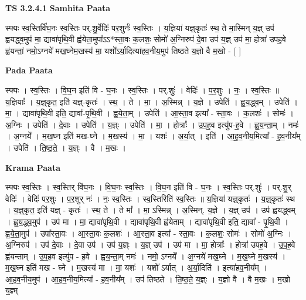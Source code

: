 \documentclass[17pt]{extarticle}
\begin{document}
\textbf{TS 3.2.4.1 } \newline
\textbf{Samhita Paata} \newline

स्फ्यः स्व॒स्तिर्वि॑घ॒नः स्व॒स्तिः पर्.शु॒र्वेदिः॑ पर॒शुर्नः॑ स्व॒स्तिः । य॒ज्ञिया॑ यज्ञ्॒कृतः॑ स्थ॒ ते मा॒स्मिन् य॒ज्ञ् उप॑ ह्वयद्ध्व॒मुप॑ मा॒ द्यावा॑पृथि॒वी ह्व॑येता॒मुपा᳚ऽऽ*स्ता॒वः क॒लशः॒ सोमो॑ अ॒ग्निरुप॑ दे॒वा उप॑ य॒ज्ञ् उप॑ मा॒ होत्रा॑ उपह॒वे ह्व॑यन्तां॒ नमो॒ऽग्नये॑ मख॒घ्नेम॒खस्य॑ मा॒ यशो᳚ऽर्या॒दित्या॑हव॒नीय॒मुप॑ तिष्ठते य॒ज्ञो वै म॒खो - [  ] \newline

\textbf{Pada Paata} \newline

स्फ्यः । स्व॒स्तिः । वि॒घ॒न इति॑ वि - घ॒नः । स्व॒स्तिः । पर्.शुः॑ । वेदिः॑ । प॒र॒शुः । नः॒ । स्व॒स्तिः ॥ य॒ज्ञियाः᳚ । य॒ज्ञ्॒कृत॒ इति॑ यज्ञ्-कृतः॑ । स्थ॒ । ते । मा॒ । अ॒स्मिन्न् । य॒ज्ञे । उपेति॑ । ह्व॒य॒द्ध्व॒म् । उपेति॑ । मा॒ । द्यावा॑पृथि॒वी इति॒ द्यावा᳚-पृ॒थि॒वी । ह्व॒ये॒ता॒म् । उपेति॑ । आ॒स्ता॒व इत्या᳚ - स्ता॒वः । क॒लशः॑ । सोमः॑ । अ॒ग्निः । उपेति॑ । दे॒वाः । उपेति॑ । य॒ज्ञ्ः । उपेति॑ । मा॒ । होत्राः᳚ । उ॒प॒ह॒व इत्यु॑प-ह॒वे । ह्व॒य॒न्ता॒म् । नमः॑ । अ॒ग्नये᳚ । म॒ख॒घ्न इति॑ मख-घ्ने । म॒खस्य॑ । मा॒ । यशः॑ । अ॒र्या॒त् । इति॑ । आ॒ह॒व॒नीय॒मित्या᳚ - ह॒व॒नीय᳚म् । उपेति॑ । ति॒ष्ठ॒ते॒ । य॒ज्ञ्ः । वै । म॒खः ।  \newline


\textbf{Krama Paata} \newline

स्फ्यः स्व॒स्तिः । स्व॒स्तिर् वि॑घ॒नः । वि॒घ॒नः स्व॒स्तिः । वि॒घ॒न इति॑ वि - घ॒नः । स्व॒स्तिः पर्.शुः॑ । पर्.शु॒र् वेदिः॑ । वेदिः॑ पर॒शुः । प॒र॒शुर् नः॑ । नः॒ स्व॒स्तिः । स्व॒स्तिरिति॑ स्व॒स्तिः ॥ य॒ज्ञिया॑ यज्ञ्॒कृतः॑ । य॒ज्ञ्॒कृतः॑ स्थ । य॒ज्ञ्॒कृत॒ इति॑ यज्ञ् - कृतः॑ । स्थ॒ ते । ते मा᳚ । मा॒ ऽस्मिन्न् । अ॒स्मिन्. य॒ज्ञे । य॒ज्ञ् उप॑ । उप॑ ह्वयद्ध्वम् । ह्व॒य॒द्ध्व॒मुप॑ । उप॑ मा । मा॒ द्यावा॑पृथि॒वी । द्यावा॑पृथि॒वी ह्व॑येताम् । द्यावा॑पृथि॒वी इति॒ द्यावा᳚ - पृ॒थि॒वी । ह्व॒ये॒ता॒मुप॑ । उपा᳚स्ता॒वः । आ॒स्ता॒वः क॒लशः॑ । आ॒स्ता॒व इत्या᳚ - स्ता॒वः । क॒लशः॒ सोमः॑ । सोमो॑ अ॒ग्निः । अ॒ग्निरुप॑ । उप॑ दे॒वाः । दे॒वा उप॑ । उप॑ य॒ज्ञ्ः । य॒ज्ञ् उप॑ । उप॑ मा । मा॒ होत्राः᳚ । होत्रा॑ उपह॒वे । उ॒प॒ह॒वे ह्व॑यन्ताम् । उ॒प॒ह॒व इत्यु॑प - ह॒वे । ह्व॒य॒न्ता॒म् नमः॑ । नमो॒ ऽग्नये᳚ । अ॒ग्नये॑ मख॒घ्ने । म॒ख॒घ्ने म॒खस्य॑ । म॒ख॒घ्न इति॑ मख - घ्ने । म॒खस्य॑ मा । मा॒ यशः॑ । यशो᳚ ऽर्यात् । अ॒र्या॒दिति॑ । इत्या॑हव॒नीय᳚म् । आ॒ह॒व॒नीय॒मुप॑ । आ॒ह॒व॒नीय॒मित्या᳚ - ह॒व॒नीय᳚म् । उप॑ तिष्ठते । ति॒ष्ठ॒ते॒ य॒ज्ञ्ः । य॒ज्ञो वै । वै म॒खः । म॒खो य॒ज्ञ्म् \newline
\end{document}
